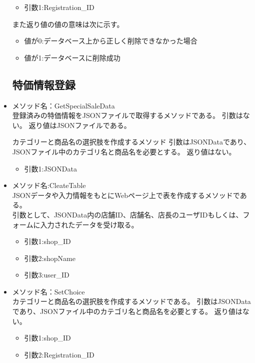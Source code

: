 \documentclass[a4j]{jarticle}
\begin{document}
\begin{itemize}
	\begin{itemize}
		\item 引数1:Registration\_ID
	\end{itemize}
また返り値の値の意味は次に示す。
	\begin{itemize}
		\item 値が0:データベース上から正しく削除できなかった場合
		\item 値が1:データベースに削除成功
	\end{itemize}
\subsection{特価情報登録}
%
\item メソッド名：GetSpecialSaleData\\

登録済みの特価情報をJSONファイルで取得するメソッドである。
引数はない。
返り値はJSONファイルである。

カテゴリーと商品名の選択肢を作成するメソッド
引数はJSONDataであり、JSONファイル中のカテゴリ名と商品名を必要とする。
返り値はない。
	\begin{itemize}
		\item 引数1:JSONData
	\end{itemize}
	\item メソッド名:CleateTable\\
JSONデータや入力情報をもとにWebページ上で表を作成するメソッドである。\\
引数として、JSONData内の店舗ID、店舗名、店長のユーザIDもしくは、フォームに入力されたデータを受け取る。
	\begin{itemize}	
		\item 引数1:shop\_ID
		\item 引数2:shopName
		\item 引数3:user\_ID
	\end{itemize}
\item メソッド名：SetChoice\\

カテゴリーと商品名の選択肢を作成するメソッドである。
引数はJSONDataであり、JSONファイル中のカテゴリ名と商品名を必要とする。
返り値はない。
	\begin{itemize}
		\item 引数1:shop\_ID
		\item 引数2:Registration\_ID
	\end{itemize}
			

\end{itemize}
\end{document}
